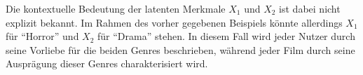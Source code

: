 Die kontextuelle Bedeutung der latenten Merkmale \(X_{1}\) und \(X_{2}\) ist dabei nicht explizit bekannt.
Im Rahmen des vorher gegebenen Beispiels könnte allerdings \(X_{1}\) für \enquote{Horror} und \(X_{2}\) für \enquote{Drama} stehen.
In diesem Fall wird jeder Nutzer durch seine Vorliebe für die beiden Genres beschrieben, während jeder Film durch seine Ausprägung dieser Genres charakterisiert wird.

\begin{comment}
Für die grundlegende Idee von Empfehlungssystemen verweilen wir beim Beispiel der Filmempfehlungen.



Das Ziel des Empfehlungssystems ist, basierend auf den vorhandenen Bewertungen möglichst präzise Empfehlungen für fehlende Einträge zu generieren.



Fehlende Bewertungen können damit als Skalarprodukt der jeweiligen Vektoren approximiert werden, wie in der Abbildung farblich hervorgehoben ist.


Zur Bewertung der Qualität eines Empfehlungssystems können verschiedenen Metriken herangezogen werden, die die Genauigkeit der Approximation anhand der Abweichung zwischen den einzelnen bekannten und vorhergesagten Werten messbar machen.
Auf die Formeln der Metriken wird hier allerdings nicht genauer eingegangen.
Damit stellt sich nur noch die Frage, wie die Matrizen \(U^{'}\) und \(V^{'}\) berechnet werden können, um eine möglichst genaue Approximation zu erzielen. \cite{cremonesiPerformanceRecommenderAlgorithms2010a}

\section{Mathematische Herleitung}


\end{comment}
